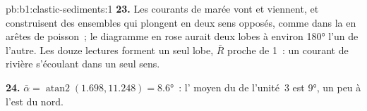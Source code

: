 \begin{solution}{pb:b1:clastic-sediments:1}
\textbf{23.} Les courants de marée vont et viennent, et construisent des ensembles qui plongent en deux
sens opposés, comme dans la  en arêtes de poisson~; le diagramme en rose aurait
deux lobes à environ \ang{180} l'un de l'autre. Les douze lectures forment un seul lobe,
$\bar R$ proche de 1~: un courant de rivière s'écoulant dans un seul sens.

\textbf{24.} $\bar\alpha = \operatorname{atan2}(1.698, 11.248) = \ang{8.6}$~:
l' moyen du  de l'unité~3 est \ang{9}, un peu à l'est du nord.
\end{solution}
